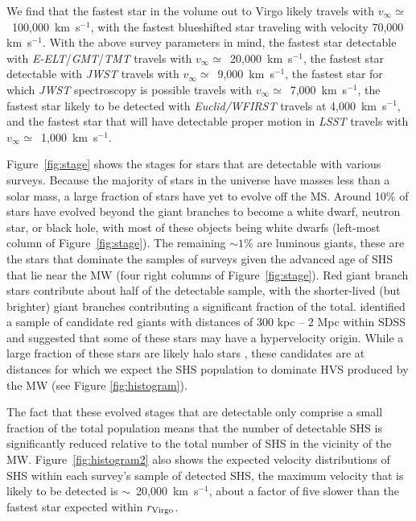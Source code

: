 \documentclass[a4paper,twocolumn]{emulateapj}
\begin{document}
{We find that the fastest star in the volume out to Virgo likely travels with $v_{\infty} \simeq$~100,000~km~s$^{-1}$, with the fastest blueshifted star traveling with velocity 70,000 km~s$^{-1}$. With the above survey parameters in mind, the fastest star detectable with {\it E-ELT}/{\it GMT}/{\it TMT} travels with $v_{\infty} \simeq$~20,000~km~s$^{-1}$, the fastest star detectable with {\it JWST} travels with $v_{\infty} \simeq$~9,000~km~s$^{-1}$, the fastest star for which {\it JWST} spectroscopy is possible travels with $v_{\infty} \simeq$~7,000~km~s$^{-1}$, the fastest star likely to be detected with {\it Euclid/WFIRST} travels at 4,000~km~s$^{-1}$, and the fastest star that will have detectable proper motion in {\it LSST} travels with $v_{\infty} \simeq$~1,000~km~s$^{-1}$.

Figure~\ref{fig:stage} shows the stages for stars that are detectable with various surveys. Because the majority of stars in the universe have masses less than a solar mass, a large fraction of stars have yet to evolve off the MS. Around 10\% of stars have evolved beyond the giant branches to become a white dwarf, neutron star, or black hole, with most of these objects being white dwarfs (left-most column of Figure~\ref{fig:stage}). The remaining $\sim 1$\% are luminous giants, these are the stars that dominate the samples of surveys given the advanced age of SHS that lie near the MW (four right columns of Figure~\ref{fig:stage}). Red giant branch stars contribute about half of the detectable sample, with the shorter-lived (but brighter) giant branches contributing a significant fraction of the total. \citet{Palladino:2012a} identified a sample of candidate red giants with distances of 300 kpc -- 2 Mpc within SDSS and suggested that some of these stars may have a hypervelocity origin. While a large fraction of these stars are likely halo stars \citep{Bochanski:2014a}, these candidates are at distances for which we expect the SHS population to dominate HVS produced by the MW (see Figure \ref{fig:histogram}).

The fact that these evolved stages that are detectable only comprise a small fraction of the total population means that the number of detectable SHS is significantly reduced relative to the total number of SHS in the vicinity of the MW. Figure~\ref{fig:histogram2} also shows the expected velocity distributions of SHS within each survey's sample of detected SHS, the maximum velocity that is likely to be detected is $\sim$~20,000~km~s$^{-1}$, about a factor of five slower than the fastest star expected within $r_{\rm Virgo}$.

}
\end{document}
